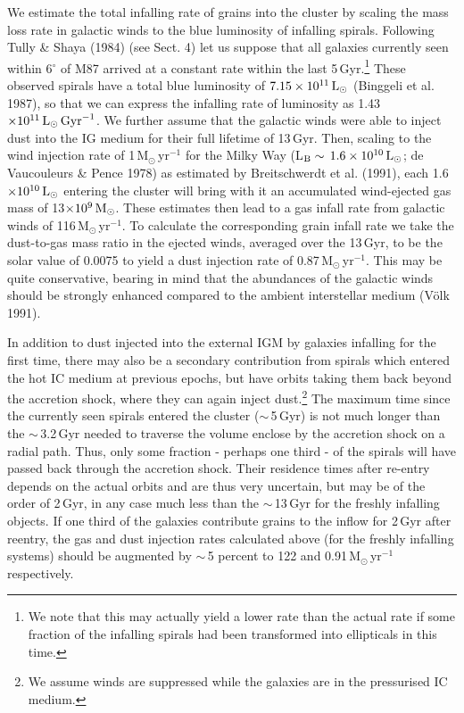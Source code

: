 \documentclass[]{aa}
\begin{document}
We estimate the total infalling 
rate of grains into the cluster by
scaling the mass loss rate in galactic winds
to the blue luminosity of infalling spirals.
Following Tully \& Shaya (1984) (see Sect. 4) let us suppose that all galaxies 
currently seen within 6$^{\circ}$ of M87 arrived
at a constant rate within the last 5\,Gyr.\protect\footnote
{We note that this may actually yield a lower rate than the 
actual rate if some fraction of the infalling spirals had been transformed 
into ellipticals in this time.} These observed spirals have a 
total blue luminosity of $7.15\times 10^{11}\,{\rm L}_{\odot}$ 
(Binggeli et al. 1987), so that we can express
the infalling rate of luminosity as 
1.43$\times 10^{11}\,{\rm L}_{\odot}\,{\rm Gyr}^{-1}$.
We further assume that the galactic winds were able to inject dust into
the IG medium for their full lifetime of 13\,Gyr.
Then, scaling to the wind injection rate of 1\,M$_{\odot}\,$yr$^{-1}$ for 
the Milky Way (L$_{\rm B}\sim\,1.6\times10^{10}\,{\rm L}_{\odot}$;
de Vaucouleurs \& Pence 1978) as estimated by Breitschwerdt et al. (1991), 
each 
1.6$\times10^{10}\,{\rm L}_{\odot}$ entering the cluster will bring with it
an accumulated wind-ejected gas mass of 13$\times10^{9}\,{\rm M}_{\odot}$.
These estimates then lead to a gas infall rate from galactic winds of 
116\,M$_{\odot}\,$yr$^{-1}$. To calculate the corresponding grain infall rate
we take the dust-to-gas mass ratio in the ejected winds, averaged over
the 13\,Gyr, to be the solar value of 0.0075 to yield a dust injection
rate of 0.87\,M$_{\odot}\,$yr$^{-1}$. This may be quite conservative,
bearing in mind that the abundances of the galactic winds should be 
strongly enhanced compared to the ambient interstellar medium (V\"olk 1991).

In addition to dust injected into the external IGM by galaxies infalling
for the first time, there may also be a secondary
contribution from spirals which entered the hot IC medium at previous epochs, 
but have orbits taking them back beyond the accretion shock, where they 
can again inject dust.\footnote{We assume winds are suppressed
while the galaxies are in the pressurised IC medium.} The maximum
time since the currently seen spirals entered the cluster ($\sim\,$5\,Gyr) is
not much longer than the $\sim\,$3.2\,Gyr needed to traverse the 
volume enclose by the accretion shock on a radial path. Thus, only some 
fraction - perhaps one third - of the spirals will have passed back through 
the accretion shock. Their residence times after re-entry depends on the actual 
orbits and are thus very uncertain, but may be of the 
order of 2\,Gyr, in any case much less than the $\sim\,$13\,Gyr 
for the freshly infalling objects. If one third of the galaxies contribute
grains to the inflow for 2\,Gyr after reentry, the gas and dust injection
rates calculated above (for the freshly infalling systems) should be 
augmented by $\sim\,$5 percent to
122 and 0.91\,M$_{\odot}\,$yr$^{-1}$ respectively.
\end{document}

